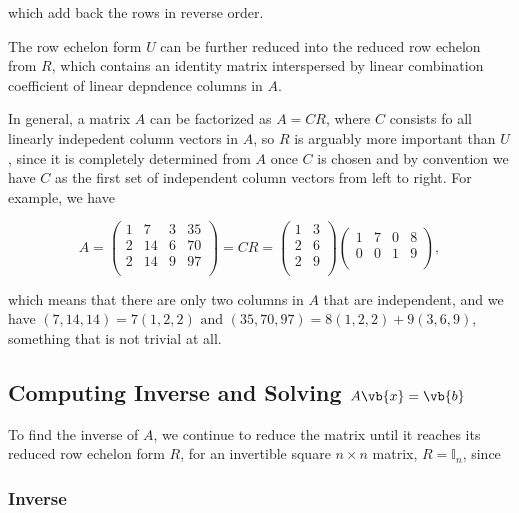 \documentclass[a4paper,12pt]{report}
\begin{document}
which add back the rows in reverse order.

The row echelon form \(U\) can be further reduced into the reduced row echelon from \(R\), which contains an identity matrix interspersed by linear combination coefficient of linear depndence columns in \(A\).

In general, a matrix \(A\) can be factorized as \(A = CR\), where \(C\) consists fo all linearly indepedent column vectors in \(A\), so \(R\) is arguably more important than \(U\), since it is completely determined from \(A\) once \(C\) is chosen and by convention we have \(C\) as the first set of independent column vectors from left to right. For example, we have

\begin{equation}
    A = \begin{pmatrix}
        1 & 7 & 3 &  35 \\
        2 & 14 & 6 &  70 \\
        2 & 14 & 9 &  97 \\
    \end{pmatrix} = CR = \begin{pmatrix}
        1 &  3 \\
        2 &  6 \\
        2 &  9 \\
    \end{pmatrix} \begin{pmatrix}
        1 & 7 & 0 &  8 \\
        0 & 0 & 1 &  9 \\
    \end{pmatrix},
\end{equation}

which means that there are only two columns in \(A\) that are independent, and we have \((7,14,14) = 7(1,2,2) \text { and } (35,70,97) = 8(1,2,2) + 9(3,6,9)\), something that is not trivial at all.  

\subsection{Computing Inverse and Solving \(A\vb{x} = \vb{b} \)}

To find the inverse of \(A\), we continue to reduce the matrix until it reaches its reduced row echelon form \(R\), for an invertible square \(n \times n\) matrix, \(R = \mathbb{I}_{n} \), since

\subsubsection{Inverse}
\end{document}
